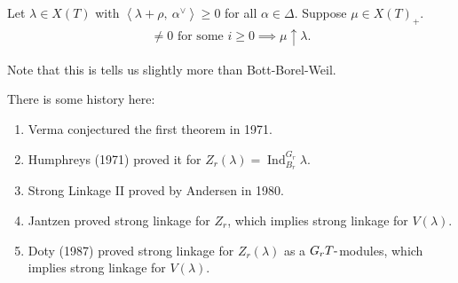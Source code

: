 \begin{theorem}

Let \(\lambda \in X(T)\) with
\({\left\langle {\lambda + \rho},~{\alpha^\vee} \right\rangle} \geq 0\)
for all \(\alpha\in \Delta\). Suppose \(\mu \in X(T)_+\).
\begin{align*}
[H^i w\cdot \lambda : L(\mu)] \neq 0 \text{ for some } i\geq 0 \implies \mu \uparrow \lambda
.\end{align*}

\end{theorem}

\begin{remark}

Note that this is tells us slightly more than Bott-Borel-Weil.

\end{remark}

\begin{remark}

There is some history here:

\begin{enumerate}
\def\labelenumi{\arabic{enumi}.}
\item
  Verma conjectured the first theorem in 1971.
\item
  Humphreys (1971) proved it for
  \(Z_r(\lambda) = \operatorname{Ind}_{B_r}^{G_r} \lambda\).
\item
  Strong Linkage II proved by Andersen in 1980.
\item
  Jantzen proved strong linkage for \(Z_r\), which implies strong
  linkage for \(V(\lambda)\).
\item
  Doty (1987) proved strong linkage for \(Z_r(\lambda)\) as a
  \(G_rT{\hbox{-}}\)modules, which implies strong linkage for
  \(V(\lambda)\).
\end{enumerate}

\end{remark}

